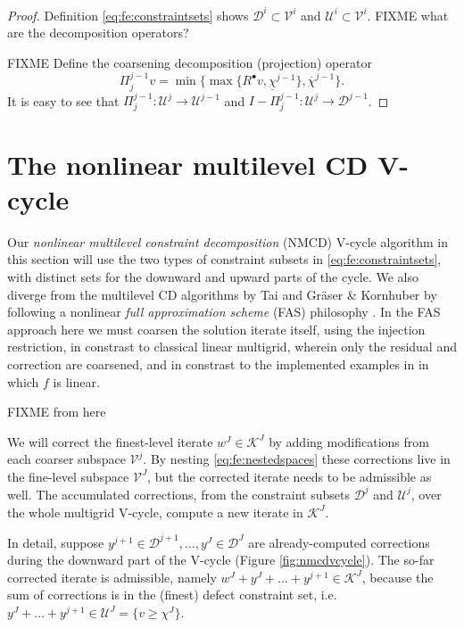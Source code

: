 \documentclass[letterpaper,final,12pt,reqno]{amsart}
\theoremstyle{cstyle}
\theoremstyle{cstyle*}
\theoremstyle{dstyle}
\numberwithin{equation}{section}
\numberwithin{figure}{section}
\numberwithin{table}{section}
\numberwithin{theorem}{section}
\newcommand{\cV}{\mathcal{V}}
\newcommand{\iR}{R^{\bullet}}
\begin{document}
\begin{proof}  Definition \eqref{eq:fe:constraintsets} shows $\mathcal{D}^i \subset \cV^i$ and $\mathcal{U}^i \subset \cV^i$.  FIXME what are the decomposition operators?

FIXME Define the coarsening decomposition (projection) operator
    $$\Pi_j^{j-1} v = \min\{\max\{\iR v, \underline{\chi}^{j-1}\}, \overline{\chi}^{j-1}\}.$$
It is easy to see that $\Pi_j^{j-1}:\mathcal{U}^j \to \mathcal{U}^{j-1}$ and $I-\Pi_j^{j-1}:\mathcal{U}^j \to \mathcal{D}^{j-1}$.
\end{proof}
 


\section{The nonlinear multilevel CD V-cycle} \label{sec:vcycle}

Our \emph{nonlinear multilevel constraint decomposition} (NMCD) V-cycle algorithm in this section will use the two types of constraint subsets in \eqref{eq:fe:constraintsets}, with distinct sets for the downward and upward parts of the cycle.  We also diverge from the multilevel CD algorithms by Tai \cite{Tai2003} and Gr\"aser \& Kornhuber \cite[Algorithm 4.7]{GraeserKornhuber2009} by following a nonlinear \emph{full approximation scheme} (FAS) philosophy \cite{BrandtLivne2011}.  In the FAS approach here we must coarsen the solution iterate itself, using the injection restriction, in constrast to classical linear multigrid, wherein only the residual and correction are coarsened, and in constrast to the implemented examples in \cite{GraeserKornhuber2009,Tai2003} in which $f$ is linear.

FIXME from here

We will correct the finest-level iterate $w^J\in \mathcal{K}^J$ by adding modifications from each coarser subspace $\mathcal{V}^j$.  By nesting \eqref{eq:fe:nestedspaces} these corrections live in the fine-level subspace $\mathcal{V}^J$, but the corrected iterate needs to be admissible as well.  The accumulated corrections, from the constraint subsets $\mathcal{D}^j$ and $\mathcal{U}^j$, over the whole multigrid V-cycle, compute a new iterate in $\mathcal{K}^J$.

In detail, suppose $y^{j+1} \in \mathcal{D}^{j+1}, \dots, y^J \in \mathcal{D}^J$ are already-computed corrections during the downward part of the V-cycle (Figure \ref{fig:nmcdvcycle}).  The so-far corrected iterate is admissible, namely $w^J + y^J + \dots + y^{j+1} \in \mathcal{K}^J$, because the sum of corrections is in the (finest) defect constraint set, i.e.~$y^J + \dots + y^{j+1} \in \mathcal{U}^J = \{v\ge \chi^J\}$.
\end{document}
